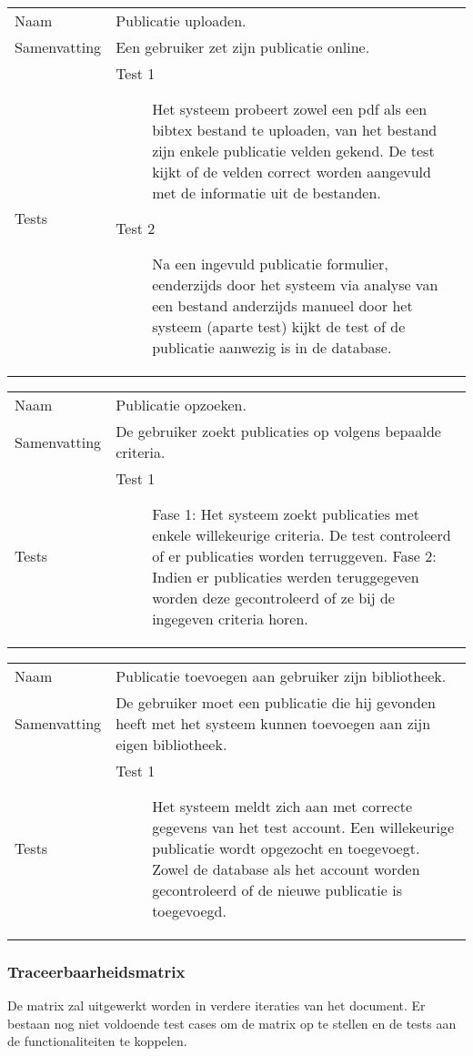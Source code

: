 \documentclass[a4paper]{article}
\begin{document}
\begin{longtable}{lp{10cm}}
Naam           & Publicatie uploaden.\\
Samenvatting   & Een gebruiker zet zijn publicatie online.\\
Tests   & 

\begin{description}

\item[Test 1] Het systeem probeert zowel een pdf als een bibtex bestand te uploaden, van het bestand zijn enkele publicatie velden gekend. De test kijkt of de velden correct worden aangevuld met de informatie uit de bestanden.
\item [Test 2] Na een ingevuld publicatie formulier, eenderzijds door het systeem via analyse van een bestand anderzijds manueel door het systeem (aparte test) kijkt de test of de publicatie aanwezig is in de database.

\end{description}

\end{longtable}

\begin{longtable}{lp{10cm}}
Naam           & Publicatie opzoeken.\\
Samenvatting   & De gebruiker zoekt publicaties op volgens bepaalde criteria.\\
Tests   & 

\begin{description}

\item[Test 1] Fase 1: Het systeem zoekt publicaties met enkele willekeurige criteria. De test controleerd of er publicaties worden terruggeven.\newline
			  Fase 2: Indien er publicaties werden teruggegeven worden deze gecontroleerd of ze bij de ingegeven criteria horen.

\end{description}

\end{longtable}

\begin{longtable}{lp{10cm}}
Naam           & Publicatie toevoegen aan gebruiker zijn bibliotheek.\\
Samenvatting   & De gebruiker moet een publicatie die hij gevonden heeft met het systeem kunnen 				 toevoegen aan zijn eigen bibliotheek.\\
Tests   & 

\begin{description}

\item[Test 1] Het systeem meldt zich aan met correcte gegevens van het test account. Een willekeurige publicatie wordt opgezocht en toegevoegt. Zowel de database als het account worden gecontroleerd of de nieuwe publicatie is toegevoegd.

\end{description}

\end{longtable}

\subsubsection{Traceerbaarheidsmatrix}

De matrix zal uitgewerkt worden in verdere iteraties van het document. Er bestaan nog niet voldoende test cases om de matrix op te stellen en de tests aan de functionaliteiten te koppelen.
\end{document}
